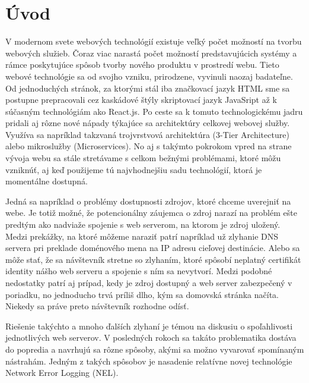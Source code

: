 \chapter{Úvod}
\label{uvod}
\vspace{1cm}


V modernom svete webových technológií existuje veľký počet možností na tvorbu webových služieb. Čoraz viac narastá počet možností predstavujúcich systémy a rámce poskytujúce spôsob tvorby nového produktu v prostredí webu.
Tieto webové technológie sa od svojho vzniku, prirodzene, vyvinuli naozaj badateľne. 
Od jednoduchých stránok, za ktorými stál iba značkovací jazyk 
HTML sme sa postupne prepracovali cez kaskádové štýly skriptovací jazyk 
JavaSript až k súčasným technológiám ako React.js. 
Po ceste sa k tomuto technologickému jadru pridali aj rôzne 
nové nápady týkajúce sa architektúry celkovej webovej služby. 
Využíva sa napríklad takzvaná trojvrstvová architektúra (3-Tier Architecture) alebo mikroslužby (Microservices). 
No aj s takýmto pokrokom vpred na strane vývoja webu sa stále stretávame s celkom bežnými problémami, ktoré môžu vzniknúť, aj 
keď použijeme tú najvhodnejšiu sadu technológií, ktorá je momentálne dostupná.

Jedná sa napríklad o problémy dostupnosti zdrojov, ktoré chceme uverejniť na webe. 
Je totiž možné, že potencionálny záujemca o zdroj narazí na problém ešte predtým ako nadviaže spojenie s web serverom, na ktorom je zdroj uložený.
Medzi prekážky, na ktoré môžeme naraziť patrí napríklad už zlyhanie DNS servera pri preklade doménového mena na IP adresu cieľovej destinácie. 
Alebo sa môže stať, že sa návštevník stretne so zlyhaním, ktoré spôsobí neplatný certifikát identity nášho web serveru a spojenie s ním sa nevytvorí. 
Medzi podobné nedostatky patrí aj prípad, kedy je zdroj dostupný a web server zabezpečený v poriadku, no jednoducho trvá príliš dlho, kým sa domovská stránka načíta. Niekedy sa práve preto návštevník rozhodne odísť.

Riešenie takýchto a mnoho ďalších zlyhaní je témou na diskusiu o spoľahlivosti jednotlivých web serverov. 
V posledných rokoch sa takáto problematika dostáva do popredia a navrhujú sa rôzne 
spôsoby, akými sa možno vyvarovať spomínaným nástrahám. Jedným z takých spôsobov je nasadenie relatívne novej 
technológie Network Error Logging (NEL).

\pagebreak

